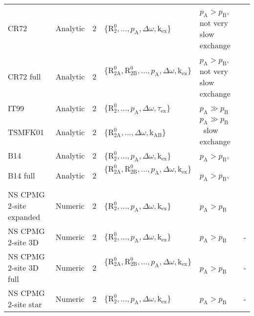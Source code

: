\documentclass[a4paper,11pt,twoside,openright]{book}
\begin{document}
{\begin{landscape}
\begin{center}
\begin{small}
\begin{longtable}{llllll}
CR72                     & Analytic & 2     & $\{\mathrm{R}_2^0, \dots, p_{\textrm{A}}, \Delta\omega , \textrm{k}_{\textrm{ex}}\}$\               & $p_{\textrm{A}}> p_{\textrm{B}}$, not very slow exchange & \citet{CarverRichards72} \\
CR72 full                & Analytic & 2     & $\{\mathrm{R}_{\mathrm{2A}}^0, \mathrm{R}_{\mathrm{2B}}^0, \dots, p_{\textrm{A}}, \Delta\omega , \textrm{k}_{\textrm{ex}}\}$\  & $p_{\textrm{A}}> p_{\textrm{B}}$, not very slow exchange & \citet{CarverRichards72} \\
IT99                     & Analytic & 2     & $\{\mathrm{R}_2^0, \dots, p_{\textrm{A}}, \Delta\omega , \tau_{\textrm{ex}}\}$\               & $p_{\textrm{A}}\gg p_{\textrm{B}}$\                      & \citet{IshimaTorchia99} \\
TSMFK01                  & Analytic & 2     & $\{\mathrm{R}_{\mathrm{2A}}^0, \dots, \Delta\omega , \textrm{k}_{\textrm{AB}}\}$\                   & $p_{\textrm{A}}\gg p_{\textrm{B}}$\  slow exchange       & \citet{Tollinger01} \\
B14                      & Analytic & 2     & $\{\mathrm{R}_2^0, \dots, p_{\textrm{A}}, \Delta\omega , \textrm{k}_{\textrm{ex}}\}$\               & $p_{\textrm{A}}> p_{\textrm{B}}$,                      & \citet{Baldwin2014} \\
B14 full                 & Analytic & 2     & $\{\mathrm{R}_{\mathrm{2A}}^0, \mathrm{R}_{\mathrm{2B}}^0, \dots, p_{\textrm{A}}, \Delta\omega , \textrm{k}_{\textrm{ex}}\}$\  & $p_{\textrm{A}}> p_{\textrm{B}}$,                      & \citet{Baldwin2014} \\
NS CPMG 2-site expanded  & Numeric  & 2     & $\{\mathrm{R}_2^0, \dots, p_{\textrm{A}}, \Delta\omega , \textrm{k}_{\textrm{ex}}\}$\               & $p_{\textrm{A}}> p_{\textrm{B}}$\                        & \citet{Tollinger01} \\
NS CPMG 2-site 3D        & Numeric  & 2     & $\{\mathrm{R}_2^0, \dots, p_{\textrm{A}}, \Delta\omega , \textrm{k}_{\textrm{ex}}\}$\               & $p_{\textrm{A}}> p_{\textrm{B}}$\                        & - \\
NS CPMG 2-site 3D full   & Numeric  & 2     & $\{\mathrm{R}_{\mathrm{2A}}^0, \mathrm{R}_{\mathrm{2B}}^0, \dots, p_{\textrm{A}}, \Delta\omega , \textrm{k}_{\textrm{ex}}\}$\  & $p_{\textrm{A}}> p_{\textrm{B}}$\                        & - \\
NS CPMG 2-site star      & Numeric  & 2     & $\{\mathrm{R}_2^0, \dots, p_{\textrm{A}}, \Delta\omega , \textrm{k}_{\textrm{ex}}\}$\               & $p_{\textrm{A}}> p_{\textrm{B}}$\                        & - \\

\end{longtable}
\end{small}
\end{center}
\end{landscape}}
\end{document}
